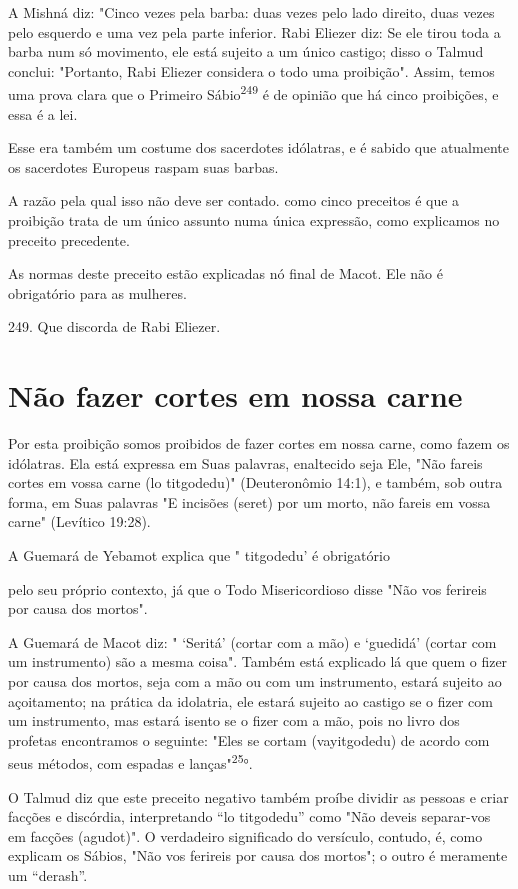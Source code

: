 A Mishná diz: "Cinco vezes pela barba: duas vezes pelo lado direito,
duas vezes pelo esquerdo e uma vez pela parte inferior. Rabi Eliezer
diz: Se ele tirou toda a barba num só movimento, ele está sujeito a um
único castigo; disso o Talmud conclui: "Portanto, Rabi Eliezer considera
o todo uma proibição". Assim, temos uma prova clara que o Primeiro
Sábio\textsuperscript{249} é de opinião que há cin­co proibições, e essa
é a lei.

Esse era também um costume dos sacerdotes idólatras, e é sabido que
atualmente os sacerdotes Europeus raspam suas barbas.

A razão pela qual isso não deve ser contado. como cinco preceitos é que
a proibição trata de um único assunto numa única expressão, como
ex­plicamos no preceito precedente.

As normas deste preceito estão explicadas nó final de Macot. Ele não é
obrigatório para as mulheres.

249. Que discorda de Rabi Eliezer.

\section{Não fazer cortes em nossa carne}

Por esta proibição somos proibidos de fazer cortes em nossa carne, como
fazem os idólatras. Ela está expressa em Suas palavras, enaltecido seja
Ele, "Não fareis cortes em vossa carne (lo titgodedu)" (Deuteronômio
14:1), e tam­bém, sob outra forma, em Suas palavras "E incisões (seret)
por um morto, não fareis em vossa carne" (Levítico 19:28).

A Guemará de Yebamot explica que " titgodedu' é obrigatório

pelo seu próprio contexto, já que o Todo Misericordioso disse "Não vos
feri­reis por causa dos mortos".

A Guemará de Macot diz: " `Seritá' (cortar com a mão) e `guedidá'
(cortar com um instrumento) são a mesma coisa". Também está explicado lá
que quem o fizer por causa dos mortos, seja com a mão ou com um
instrumen­to, estará sujeito ao açoitamento; na prática da idolatria,
ele estará sujeito ao castigo se o fizer com um instrumento, mas estará
isento se o fizer com a mão, pois no livro dos profetas encontramos o
seguinte: "Eles se cortam (vayitgode­du) de acordo com seus métodos, com
espadas e lanças"\textsuperscript{25}°.

O Talmud diz que este preceito negativo também proíbe dividir as pessoas
e criar facções e discórdia, interpretando ``lo titgodedu'' como "Não
deveis separar-vos em facções (agudot)". O verdadeiro significado do
versícu­lo, contudo, é, como explicam os Sábios, "Não vos ferireis por
causa dos mor­tos"; o outro é meramente um ``derash''.

